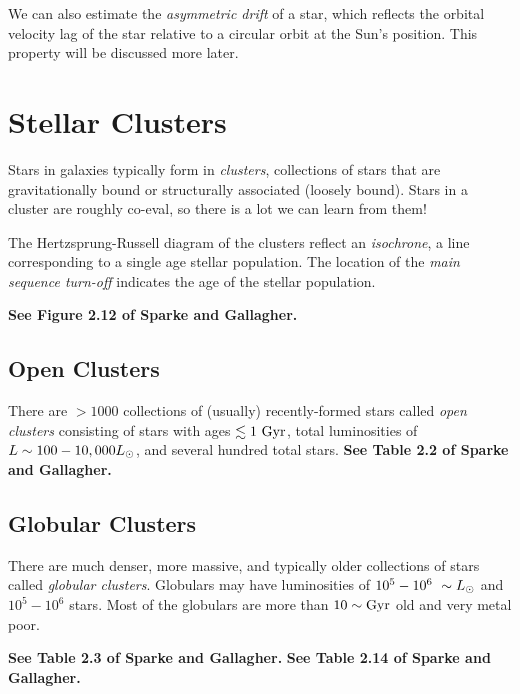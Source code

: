 \documentclass[]{article}
\begin{document}
We can also estimate the {\it asymmetric drift} of a star, which
reflects the orbital velocity lag of the star relative to a 
circular orbit at the Sun's position. This property will be
discussed more later.

\section{Stellar Clusters}

Stars in galaxies typically form in {\it clusters}, collections
of stars that are gravitationally bound or structurally associated
(loosely bound).
Stars in a cluster are roughly co-eval, so there is a lot we
can learn from them!

The Hertzsprung-Russell diagram of the clusters reflect an
{\it isochrone}, a line corresponding to a single age stellar
population. The location of the {\it main sequence turn-off}
indicates the age of the stellar population.

{\bf See Figure 2.12 of Sparke and Gallagher.}

\subsection{Open Clusters}

There are $>1000$ collections of (usually) recently-formed stars
called {\it open clusters} consisting of stars with
ages $\lesssim1~\mathrm{Gyr}$, total luminosities of 
$L\sim100-10,000L_{\odot}$, and several hundred total stars.
{\bf See Table 2.2 of Sparke and Gallagher.}


\subsection{Globular Clusters}

There are much denser, more massive, and typically older
collections of stars called {\it globular clusters}.
Globulars may have luminosities of $10^5-10^6~\sim L_{\odot}$ 
and $10^{5}-10^6$ stars. Most of the globulars are more
than $10\sim\mathrm{Gyr}$ old and very metal poor.

{\bf See Table 2.3 of Sparke and Gallagher.}
{\bf See Table 2.14 of Sparke and Gallagher.}
\end{document}
